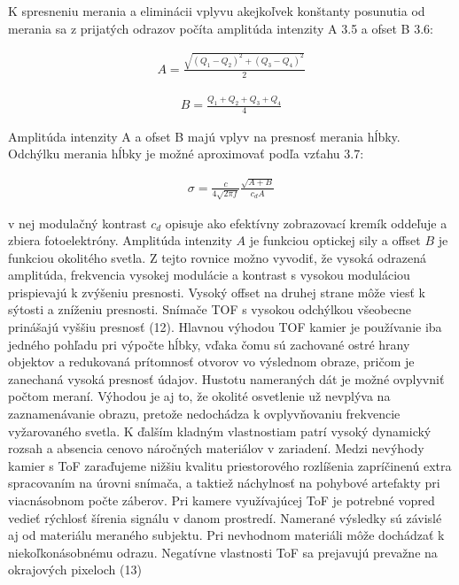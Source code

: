 K spresneniu merania a eliminácii vplyvu akejkoľvek konštanty posunutia od merania sa z
prijatých odrazov počíta amplitúda intenzity A 3.5 a ofset B 3.6:

\begin{equation}
\label{eq5}
\begin{aligned}
A=\frac{\sqrt{\left(Q_1 - Q_2\right)^2 + \left(Q_3 - Q_4\right)^2 }} {2} 
\end{aligned}
\end{equation}

\begin{equation}
\label{eq6}
\begin{aligned}
B=\frac{Q_1 + Q_2 +Q_3 + Q_4}{4} 
\end{aligned}
\end{equation}

Amplitúda intenzity A a ofset B majú vplyv na presnosť merania hĺbky. Odchýlku merania hĺbky je možné aproximovať podľa vzťahu 3.7:

\begin{equation}
\label{eq7}
\begin{aligned}
\sigma=\frac{c}{4\sqrt{2 \pi f}} \frac{\sqrt{A+B}}{c_d A}
\end{aligned}
\end{equation}

v nej modulačný kontrast $ c_d $ opisuje ako efektívny zobrazovací kremík oddeľuje a zbiera fotoelektróny. Amplitúda intenzity $ A $ je funkciou optickej sily a offset $ B $ je funkciou okolitého svetla. Z tejto rovnice možno vyvodiť, že vysoká odrazená amplitúda, frekvencia vysokej modulácie a kontrast s vysokou moduláciou prispievajú k zvýšeniu presnosti. Vysoký offset na druhej strane môže viesť k sýtosti a zníženiu presnosti. Snímače TOF s vysokou odchýlkou všeobecne prinášajú vyššiu presnosť (12). Hlavnou výhodou TOF kamier je používanie iba jedného pohľadu pri výpočte hĺbky, vďaka čomu sú zachované ostré hrany objektov a redukovaná prítomnosť otvorov vo výslednom obraze, pričom je zanechaná vysoká presnosť údajov. Hustotu nameraných dát je možné ovplyvniť počtom meraní. Výhodou je aj to, že okolité osvetlenie už nevplýva na zaznamenávanie obrazu, pretože nedochádza k ovplyvňovaniu frekvencie vyžarovaného svetla. K ďalším kladným vlastnostiam patrí vysoký dynamický rozsah a absencia cenovo náročných materiálov v zariadení. Medzi nevýhody kamier s ToF zaraďujeme nižšiu kvalitu priestorového rozlíšenia zapríčinenú extra spracovaním na úrovni snímača, a taktiež náchylnosť na pohybové artefakty pri viacnásobnom počte záberov. Pri kamere využívajúcej ToF je potrebné vopred vedieť rýchlosť šírenia signálu v danom prostredí. Namerané výsledky sú závislé aj od materiálu meraného subjektu. Pri nevhodnom materiáli môže dochádzať k niekoľkonásobnému odrazu. Negatívne vlastnosti ToF sa prejavujú prevažne na okrajových pixeloch (13)

